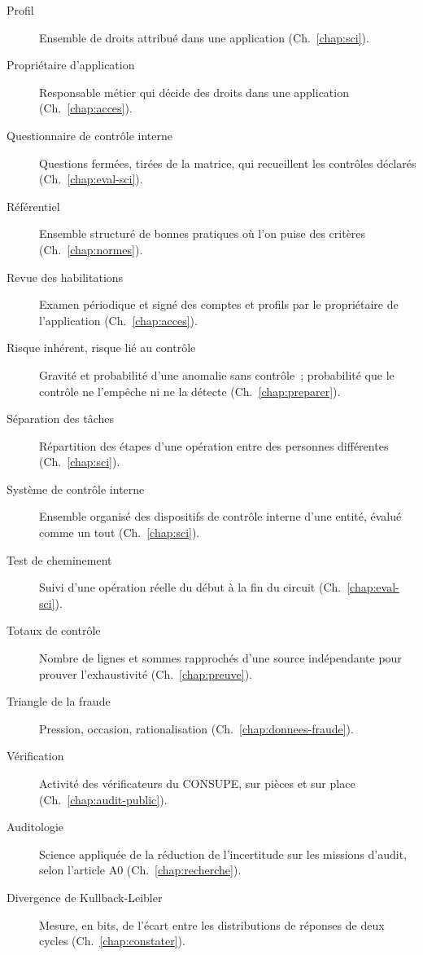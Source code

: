\begin{description}
    \item[Profil] Ensemble de droits attribué dans une application
          (Ch.~\ref{chap:sci}).
    \item[Propriétaire d'application] Responsable métier qui décide des
          droits dans une application (Ch.~\ref{chap:acces}).
    \item[Questionnaire de contrôle interne] Questions fermées, tirées de la
          matrice, qui recueillent les contrôles déclarés
          (Ch.~\ref{chap:eval-sci}).
    \item[Référentiel] Ensemble structuré de bonnes pratiques où l'on puise
          des critères (Ch.~\ref{chap:normes}).
    \item[Revue des habilitations] Examen périodique et signé des comptes et
          profils par le propriétaire de l'application (Ch.~\ref{chap:acces}).
    \item[Risque inhérent, risque lié au contrôle] Gravité et probabilité
          d'une anomalie sans contrôle~; probabilité que le contrôle ne
          l'empêche ni ne la détecte (Ch.~\ref{chap:preparer}).
    \item[Séparation des tâches] Répartition des étapes d'une opération
          entre des personnes différentes (Ch.~\ref{chap:sci}).
    \item[Système de contrôle interne] Ensemble organisé des dispositifs de
          contrôle interne d'une entité, évalué comme un tout
          (Ch.~\ref{chap:sci}).
    \item[Test de cheminement] Suivi d'une opération réelle du début à la
          fin du circuit (Ch.~\ref{chap:eval-sci}).
    \item[Totaux de contrôle] Nombre de lignes et sommes rapprochés d'une
          source indépendante pour prouver l'exhaustivité
          (Ch.~\ref{chap:preuve}).
    \item[Triangle de la fraude] Pression, occasion, rationalisation
          (Ch.~\ref{chap:donnees-fraude}).
    \item[Vérification] Activité des vérificateurs du CONSUPE, sur pièces et
          sur place (Ch.~\ref{chap:audit-public}).
    \item[Auditologie] Science appliquée de la réduction de l'incertitude
          sur les missions d'audit, selon l'article A0
          (Ch.~\ref{chap:recherche}).
    \item[Divergence de Kullback-Leibler] Mesure, en bits, de l'écart entre
          les distributions de réponses de deux cycles
          (Ch.~\ref{chap:constater}).

\end{description}
